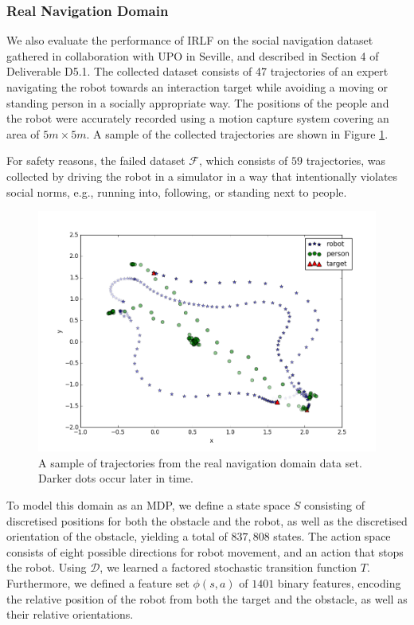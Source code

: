 \documentclass[a4paper,11pt]{report}
\begin{document}
\subsubsection{Real Navigation Domain}

We also evaluate the performance of IRLF on the social navigation dataset gathered in collaboration with UPO in Seville, and described in Section 4 of Deliverable D5.1. The collected dataset consists of 47 trajectories of an expert navigating the robot towards an interaction target while avoiding a moving or standing  person in a socially appropriate way. The positions of the people and the robot were accurately recorded using a motion capture system covering an area of $5m \times 5m$. A sample of the collected trajectories are shown in Figure \ref{fig:data}. 

For safety reasons, the failed dataset $\mathcal{F}$, which consists of $59$ trajectories, was collected by driving the robot in a simulator in a way that intentionally violates social norms, e.g., running into, following, or standing next to people. 

\begin{figure}[t]     
  \centering
    \includegraphics[width=0.55\columnwidth]{figures/data_plot.png}
  \caption{A sample of trajectories from the real navigation domain data set. Darker dots occur later in time.}
  \label{fig:data}
\end{figure}

To model this domain as an MDP, we define a state space $S$ consisting of discretised positions for both the obstacle and the robot, as well as the discretised orientation of the obstacle, yielding a total of $837,808$ states. The action space consists of eight possible directions for robot movement, and an action that stops the robot. Using $\mathcal{D}$, we learned a factored stochastic transition function $T$. Furthermore, we defined a feature set $\phi(s,a)$ of $1401$ binary features, encoding the relative position of the robot from both the target and the obstacle, as well as their relative orientations. 
\end{document}

